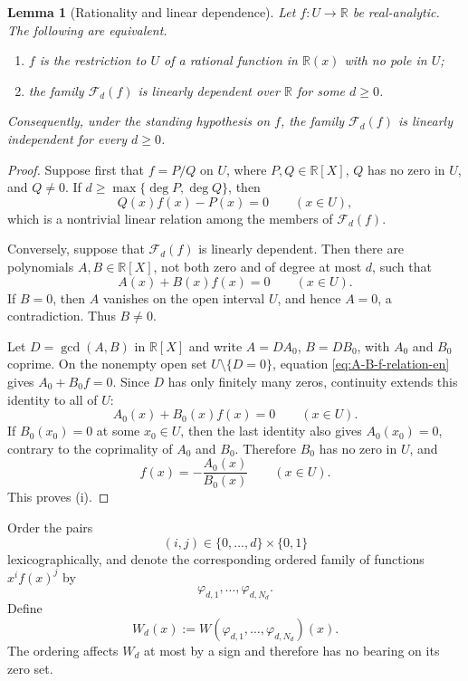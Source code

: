 \documentclass[11pt]{amsart}
\numberwithin{equation}{section}
\newtheorem{lemma}[lemma]{Lemma}
\theoremstyle{definition}
\theoremstyle{remark}
\newcommand{\R}{\mathbb R}
\begin{document}
\begin{lemma}[Rationality and linear dependence]
\label{lem:rational-independence-en}
Let $f:U\to\R$ be real-analytic. The following are equivalent.
\begin{enumerate}[label=\textup{(\roman*)},leftmargin=2.7em]
\item $f$ is the restriction to $U$ of a rational function in
$\R(x)$ with no pole in $U$;
\item the family $\mathcal F_d(f)$ is linearly dependent over $\R$
for some $d\geq0$.
\end{enumerate}
Consequently, under the standing hypothesis on $f$, the family
$\mathcal F_d(f)$ is linearly independent for every $d\geq0$.
\end{lemma}

\begin{proof}
Suppose first that $f=P/Q$ on $U$, where $P,Q\in\R[X]$, $Q$ has no
zero in $U$, and $Q\neq0$. If
$d\geq\max\{\deg P,\deg Q\}$, then
\[
Q(x)f(x)-P(x)=0
\qquad(x\in U),
\]
which is a nontrivial linear relation among the members of
$\mathcal F_d(f)$.

Conversely, suppose that $\mathcal F_d(f)$ is linearly dependent. Then
there are polynomials $A,B\in\R[X]$, not both zero and of degree at
most $d$, such that
\begin{equation}\label{eq:A-B-f-relation-en}
A(x)+B(x)f(x)=0
\qquad(x\in U).
\end{equation}
If $B=0$, then $A$ vanishes on the open interval $U$, and hence
$A=0$, a contradiction. Thus $B\neq0$.

Let $D=\gcd(A,B)$ in $\R[X]$ and write $A=DA_0$, $B=DB_0$, with
$A_0$ and $B_0$ coprime. On the nonempty open set
$U\setminus\{D=0\}$, equation \eqref{eq:A-B-f-relation-en} gives
$A_0+B_0f=0$. Since $D$ has only finitely many zeros, continuity extends this identity to all of $U$:
\[
A_0(x)+B_0(x)f(x)=0
\qquad(x\in U).
\]
If $B_0(x_0)=0$ at some $x_0\in U$, then the last identity also gives
$A_0(x_0)=0$, contrary to the coprimality of $A_0$ and $B_0$.
Therefore $B_0$ has no zero in $U$, and
\[
f(x)=-\frac{A_0(x)}{B_0(x)}
\qquad(x\in U).
\]
This proves \textup{(i)}.
\end{proof}

Order the pairs
\[
(i,j)\in\{0,\ldots,d\}\times\{0,1\}
\]
lexicographically, and denote the corresponding ordered family of
functions $x^if(x)^j$ by
\[
\varphi_{d,1},\ldots,\varphi_{d,N_d}.
\]
Define
\begin{equation}\label{eq:W-d-en}
W_d(x)
:=
W(\varphi_{d,1},\ldots,\varphi_{d,N_d})(x).
\end{equation}
The ordering affects $W_d$ at most by a sign and therefore has no
bearing on its zero set.
\end{document}
